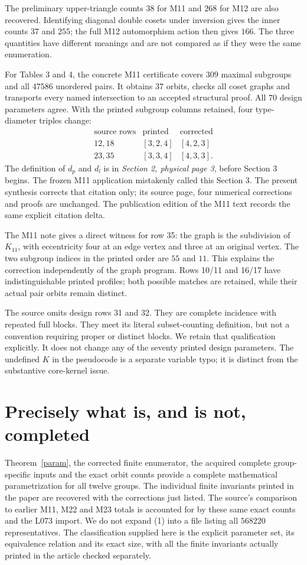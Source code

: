 \documentclass[11pt]{article}
\begin{document}
The preliminary upper-triangle counts $38$ for M11 and $268$ for M12 are
also recovered. Identifying diagonal double cosets under inversion gives the
inner counts $37$ and $255$; the full M12 automorphism action then gives
$166$. The three quantities have different meanings and are not compared
as if they were the same enumeration.

For Tables 3 and 4, the concrete M11 certificate covers $309$ maximal
subgroups and all $47586$ unordered pairs. It obtains $37$ orbits, checks
all coset graphs and transports every named intersection to an accepted
structural proof. All $70$ design parameters agree. With the printed
subgroup columns retained, four type-diameter triples change:
\[
\begin{array}{c|cc}
\text{source rows}&\text{printed}&\text{corrected}\\\hline
12,18 &[3,2,4]&[4,2,3]\\
23,35 &[3,3,4]&[4,3,3].
\end{array}
\]
The definition of $d_p$ and $d_l$ is in \emph{Section 2, physical page 3},
before Section 3 begins. The frozen M11 application mistakenly called this
Section 3. The present synthesis corrects that citation only; its source
page, four numerical corrections and proofs are unchanged. The publication
edition of the M11 text records the same explicit citation delta.

The M11 note gives a direct witness for row 35: the graph is the subdivision
of $K_{11}$, with eccentricity four at an edge vertex and three at an
original vertex. The two subgroup indices in the printed order are $55$
and $11$. This explains the correction independently of the graph program.
Rows 10/11 and 16/17 have indistinguishable printed profiles; both possible
matches are retained, while their actual pair orbits remain distinct.

The source omits design rows 31 and 32. They are complete incidence with
repeated full blocks. They meet its literal subset-counting definition,
but not a convention requiring proper or distinct blocks. We retain that
qualification explicitly. It does not change any of the seventy printed
design parameters. The undefined $K$ in the pseudocode is a separate
variable typo; it is distinct from the substantive core-kernel issue.

\section{Precisely what is, and is not, completed}
Theorem~\ref{param}, the corrected finite enumerator, the acquired complete
group-specific inputs and the exact orbit counts provide a complete
mathematical parametrization for all twelve groups. The individual finite
invariants printed in the paper are recovered with the corrections just
listed. The source's comparison to earlier M11, M22 and M23 totals is
accounted for by these same exact counts and the L073 import.
We do not expand (1) into a file listing all $568220$ representatives.
The classification supplied here is the explicit parameter set, its
equivalence relation and its exact size, with all the finite invariants
actually printed in the article checked separately.
\end{document}
